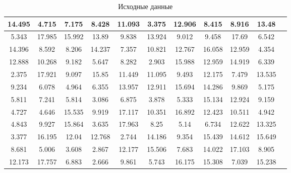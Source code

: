 \documentclass[a4paper, 14pt]{extarticle}
\begin{document}
\begin{center}
    \begin{table}[h!]
        \begin{adjustwidth}{-9mm}{-9mm} %
            \begin{tabular}{|c|c|c|c|c|c|c|c|c|c|c|}
                \hline
                14.495 & 4.715 & 7.175 & 8.428 & 11.093 & 
                3.375 & 12.906 & 8.415 & 8.916 & 13.48 \\
                \hline
                5.343 & 17.985 & 15.992 & 13.89 & 9.838 & 
                13.924 & 9.012 & 9.458 & 17.69 & 6.542 \\
                \hline
                14.396 & 8.592 & 8.206 & 14.237 & 7.357 & 
                10.821 & 12.767 & 16.058 & 12.959 & 4.354 \\
                \hline
                12.888 & 10.268 & 9.182 & 5.647 & 8.282 & 
                2.903 & 15.988 & 12.959 & 14.919 & 6.339 \\
                \hline
                2.375 & 17.921 & 9.097 & 15.85 & 11.449 & 
                11.095 & 9.493 & 12.175 & 7.479 & 13.535 \\
                \hline
                9.234 & 6.078 & 4.964 & 6.355 & 13.957 & 
                12.911 & 15.694 & 14.286 & 9.869 & 5.175 \\
                \hline
                5.811 & 7.241 & 5.814 & 3.086 & 6.875 & 
                3.878 & 5.333 & 15.134 & 12.924 & 9.159 \\
                \hline
                4.727 & 4.646 & 15.535 & 9.919 & 17.117 & 
                10.351 & 16.892 & 12.423 & 10.511 & 4.942 \\
                \hline
                4.843 & 9.927 & 15.864 & 3.635 & 17.963 & 
                8.25 & 5.14 & 6.734 & 12.622 & 13.325 \\
                \hline
                3.377 & 16.195 & 12.04 & 12.768 & 2.744 & 
                14.186 & 9.354 & 15.439 & 14.612 & 15.649 \\
                \hline
                8.681 & 5.006 & 3.608 & 2.867 & 12.177 & 
                15.506 & 7.683 & 14.022 & 17.103 & 8.905 \\
                \hline
                12.173 & 17.757 & 6.883 & 2.666 & 9.861 & 
                5.743 & 16.175 & 15.308 & 7.039 & 15.238 \\
                \hline
            \end{tabular}
            \caption{Исходные данные}
            \label{tab:data}
        \end{adjustwidth}
    \end{table}
\end{center}
\end{document}
